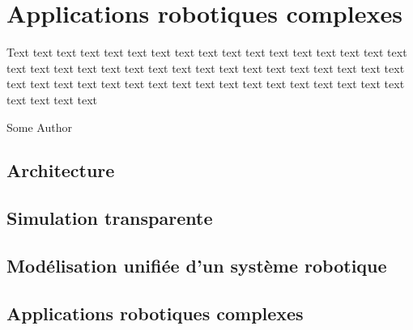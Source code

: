 \chapter{Applications robotiques complexes}
\label{chap:integration}

\epigraph{Text text text text text text text text text text text text
  text text text text text text text text text text text text text
  text text text text text text text text text text text text text
  text text text text text text text text text text text text text
  text text text text}{Some Author}
\clearpage

\section{Architecture}
\section{Simulation transparente}
\section{Modélisation unifiée d'un système robotique}
\section{Applications robotiques complexes}
